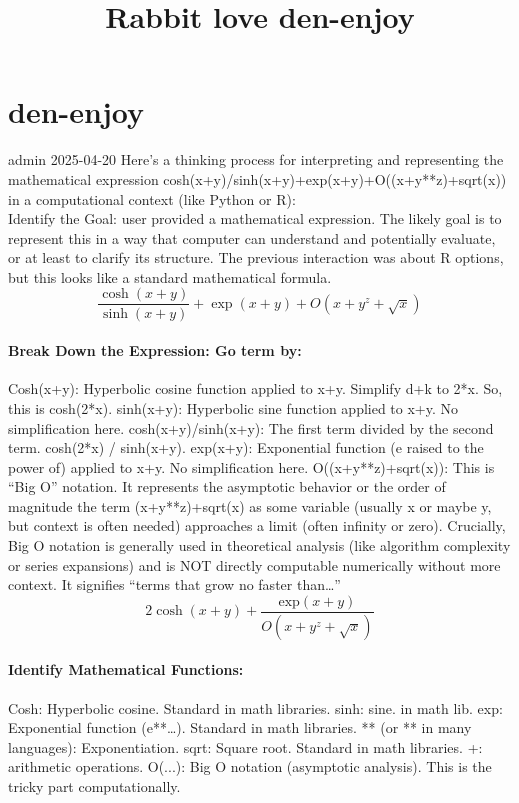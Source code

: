 \documentclass{book}
\title{Rabbit love den-enjoy}
\begin{document}
\section{den-enjoy} 
admin
2025-04-20
Here’s a thinking process for interpreting and representing the mathematical expression cosh(x+y)/sinh(x+y)+exp(x+y)+O((x+y**z)+sqrt(x)) in a computational context (like Python or R):
\textit{\\}
Identify the Goal: user provided a mathematical expression. The likely goal is to represent this  in a way that computer can understand and potentially evaluate, or at least to clarify its structure. The previous interaction was about R options, but this looks like a standard mathematical formula.
\begin{equation}
\frac{\cosh \left( x + y\right) }{\sinh \left( x + y\right) }  + \exp \left( x + y\right)  + O\left( x + y ^{z} + \sqrt{x}\right) 	
\end{equation}
\paragraph*{Break Down the Expression: Go term by:}	
	Cosh(x+y): Hyperbolic cosine function applied to x+y. Simplify d+k to 2*x. So, this is cosh(2*x).
	sinh(x+y): Hyperbolic sine function applied to x+y. No simplification here.
	cosh(x+y)/sinh(x+y): The first term divided by the second term. cosh(2*x) / sinh(x+y).
	exp(x+y): Exponential function (e raised to the power of) applied to x+y. No simplification here.
	O((x+y**z)+sqrt(x)): This is “Big O” notation. It represents the asymptotic behavior or the order of magnitude the term (x+y**z)+sqrt(x) as some variable (usually x or maybe y, but context is often needed) approaches a limit (often infinity or zero). Crucially, Big O notation is generally used in theoretical analysis (like algorithm complexity or series expansions) and is NOT directly computable numerically without more context. It signifies “terms that grow no faster than…”
\begin{equation}
2 \cosh \left( x + y\right)  + \frac{\mathrm{ exp }\left( x + y\right) }{O\left( x + y ^{z} + \sqrt{x}\right) } 	
\end{equation}
\paragraph*{Identify Mathematical Functions:}	
	
	Cosh: Hyperbolic cosine. Standard in math libraries.
	sinh:  sine.  in math lib.
	exp: Exponential function (e**…). Standard in math libraries.
	** (or ** in many languages): Exponentiation.
	sqrt: Square root. Standard in math libraries.
	+: arithmetic operations.
	O(...): Big O notation (asymptotic analysis). This is the tricky part computationally.
\textit{\\}
\end{document}
